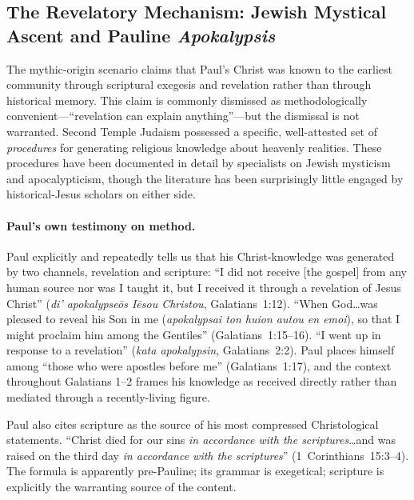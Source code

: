 \documentclass[12pt,oneside]{article}
\newcommand{\grk}[1]{\textit{#1}}   %
\begin{document}
\subsection{The Revelatory Mechanism: Jewish Mystical Ascent and Pauline \textit{Apokalypsis}}
\label{sec:myth:mystical}

The mythic-origin scenario claims that Paul's Christ was known to the
earliest community through scriptural exegesis and revelation rather
than through historical memory.  This claim is commonly dismissed as
methodologically convenient---``revelation can explain anything''---but
the dismissal is not warranted.  Second Temple Judaism possessed a
specific, well-attested set of \textit{procedures} for generating
religious knowledge about heavenly realities.  These procedures have
been documented in detail by specialists on Jewish mysticism and
apocalypticism, though the literature has been surprisingly little
engaged by historical-Jesus scholars on either side.

\paragraph{Paul's own testimony on method.}
Paul explicitly and repeatedly tells us that his Christ-knowledge was
generated by two channels, revelation and scripture:
\enquote{I did not receive [the gospel] from any human source nor was I
taught it, but I received it through a revelation of Jesus Christ}
(\grk{di' apokalypse\=os I\=esou Christou}, Galatians~1:12).
\enquote{When God\ldots was pleased to reveal his Son in me
(\grk{apokalypsai ton huion autou en emoi}), so that I might proclaim
him among the Gentiles} (Galatians~1:15--16).
\enquote{I went up in response to a revelation} (\grk{kata
apokalypsin}, Galatians~2:2).
Paul places himself among \enquote{those who were apostles before me}
(Galatians~1:17), and the context throughout Galatians 1--2 frames
his knowledge as received directly rather than mediated through a
recently-living figure.

Paul also cites scripture as the source of his most compressed
Christological statements.  \enquote{Christ died for our sins
\textit{in accordance with the scriptures}\ldots and was raised on the
third day \textit{in accordance with the scriptures}}
(1~Corinthians~15:3--4).  The formula is apparently pre-Pauline; its
grammar is exegetical; scripture is explicitly the warranting source
of the content.
\end{document}
